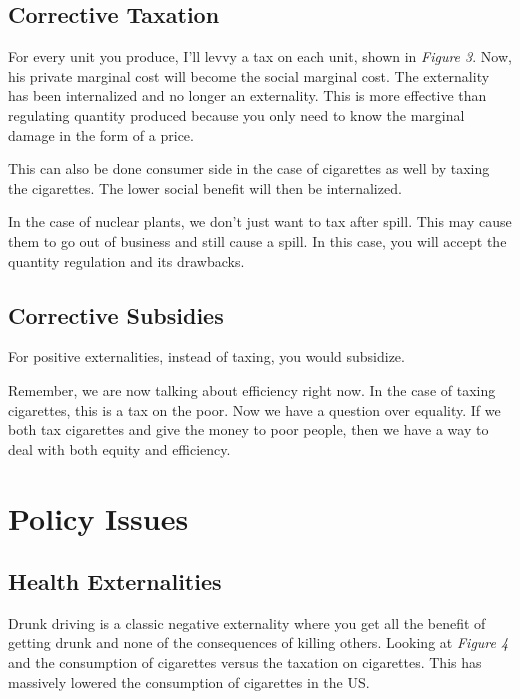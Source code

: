 \documentclass{article}
\begin{document}
\subsection{ Corrective Taxation }

For every unit you produce, I'll levvy a tax on each unit, shown in
\textit{Figure 3}. Now, his private marginal cost will become the social
marginal cost. The externality has been internalized and no longer an
externality. This is more effective than regulating quantity produced because
you only need to know the marginal damage in the form of a price.

This can also be done consumer side in the case of cigarettes as well by taxing
the cigarettes. The lower social benefit will then be internalized.

In the case of nuclear plants, we don't just want to tax after spill. This may
cause them to go out of business and still cause a spill. In this case, you will
accept the quantity regulation and its drawbacks. 

\subsection{ Corrective Subsidies }

For positive externalities, instead of taxing, you would subsidize. 

\bigbreak

Remember, we are now talking about efficiency right now. In the case of taxing
cigarettes, this is a tax on the poor. Now we have a question over equality. If
we both tax cigarettes and give the money to poor people, then we have a way to
deal with both equity and efficiency.

\section{ Policy Issues }

\subsection{ Health Externalities }

Drunk driving is a classic negative externality where you get all the benefit of
getting drunk and none of the consequences of killing others. Looking at
\textit{Figure 4} and the consumption of cigarettes versus the taxation on
cigarettes. This has massively lowered the consumption of cigarettes in the US.
\end{document}
